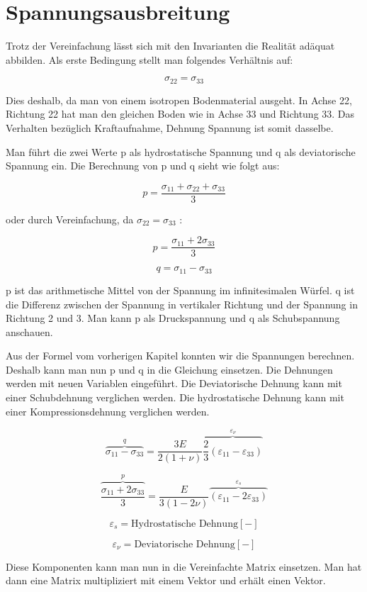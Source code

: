 \section{Spannungsausbreitung\label{spannung:section:Invarianten}}
Trotz der Vereinfachung lässt sich mit den Invarianten die Realität adäquat abbilden.
Als erste Bedingung stellt man folgendes Verhältnis auf:

\[
\sigma_{22}
=
\sigma_{33}
\]

Dies deshalb, da man von einem isotropen Bodenmaterial ausgeht.
In Achse 22, Richtung 22 hat man den gleichen Boden wie in Achse 33 und Richtung 33.
Das Verhalten bezüglich Kraftaufnahme, Dehnung Spannung ist somit dasselbe.

Man führt die zwei Werte p als hydrostatische Spannung und q als deviatorische Spannung ein.
Die Berechnung von p und q sieht wie folgt aus:

\[
p
=
\frac{\sigma_{11}+\sigma_{22}+\sigma_{33}}{3}
\]

oder durch Vereinfachung, da $\sigma_{22}=\sigma_{33}$ :

\[
p
=
\frac{\sigma_{11}+2\sigma_{33}}{3}
\]

\[
q
=
\sigma_{11}-\sigma_{33}
\]

p ist das arithmetische Mittel von der Spannung im infinitesimalen Würfel.
q ist die Differenz zwischen der Spannung in vertikaler Richtung und der Spannung in Richtung 2 und 3.
Man kann p als Druckspannung und q als Schubspannung anschauen.

Aus der Formel vom vorherigen Kapitel konnten wir die Spannungen berechnen.
Deshalb kann man nun p und q in die Gleichung einsetzen.
Die Dehnungen werden mit neuen Variablen eingeführt.
Die Deviatorische Dehnung kann mit einer Schubdehnung verglichen werden.
Die hydrostatische Dehnung kann mit einer Kompressionsdehnung verglichen werden.

\[
\overbrace{\sigma_{11}-\sigma_{33}}^{q}
=
\frac{3E}{2(1+\nu)} \overbrace{\frac{2}{3}(\varepsilon_{11} - \varepsilon_{33})}^{\varepsilon_{\nu}}
\]

\[
\overbrace{\frac{\sigma_{11}+2\sigma_{33}}{3}}^{p}
=
\frac{E}{3(1-2\nu)} \overbrace{(\varepsilon_{11} - 2\varepsilon_{33})}^{\varepsilon_{s}}
\]

\[
\varepsilon_{s}
=
\text{Hydrostatische Dehnung} [-]
\]

\[
\varepsilon_{\nu}
=
\text{Deviatorische Dehnung} [-]
\]

Diese Komponenten kann man nun in die Vereinfachte Matrix einsetzen.
Man hat dann eine Matrix multipliziert mit einem Vektor und erhält einen Vektor.

